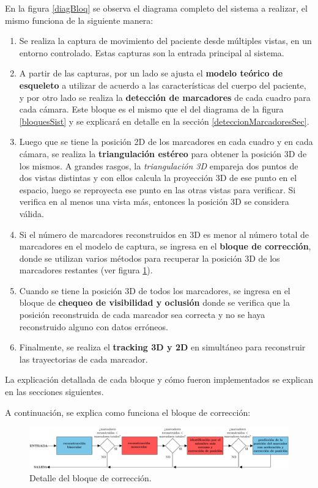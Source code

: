 En la figura \ref{diagBloq} se observa el diagrama completo del sistema a realizar, el mismo funciona de la siguiente manera:
\begin{enumerate}
\item Se realiza la captura de movimiento del paciente desde múltiples vistas, en un entorno controlado. Estas capturas son la entrada principal al sistema.
\item A partir de las capturas, por un lado se ajusta el \textbf{modelo teórico de esqueleto} a utilizar de acuerdo a las características del cuerpo del paciente, y por otro lado se realiza la \textbf{detección de marcadores} de cada cuadro para cada cámara. Este bloque es el mismo que el del diagrama de la figura \ref{bloquesSist} y se explicará en detalle en la sección \ref{deteccionMarcadoresSec}.
\item Luego que se tiene la posición 2D de los marcadores en cada cuadro y en cada cámara, se realiza la \textbf{triangulación estéreo} para obtener la posición 3D de los mismos. A grandes rasgos, la \emph{triangulación 3D} empareja dos puntos de dos vistas distintas y con ellos calcula la proyección 3D de ese punto en el espacio, luego se reproyecta ese punto en las otras vistas para verificar. Si verifica en al menos una vista más, entonces la posición 3D se considera válida.
\item Si el número de marcadores reconstruidos en 3D es menor al número total de marcadores en el modelo de captura, se ingresa en el \textbf{bloque de corrección}, donde se utilizan varios métodos para recuperar la posición 3D de los marcadores restantes (ver figura \ref{fig:bloqCorr}). 
\item Cuando se tiene la posición 3D de todos los marcadores, se ingresa en el bloque de \textbf{chequeo de visibilidad y oclusión} donde se verifica que la posición reconstruida de cada marcador sea correcta y no se haya reconstruido alguno con datos erróneos.
\item Finalmente, se realiza el \textbf{tracking 3D y 2D} en simultáneo para reconstruir las trayectorias de cada marcador.
\end{enumerate}

La explicación detallada de cada bloque y cómo fueron implementados se explican en las secciones siguientes.

A continuación, se explica como funciona el bloque de corrección:

\begin{figure}[H]
\begin{center}
\includegraphics[scale=0.25]{img/Sistema_completo/BloquesDeCorreccion}
\end{center}
\caption{Detalle del bloque de corrección.}
\label{fig:bloqCorr}
\end{figure}

